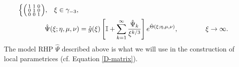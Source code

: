 \documentclass[usenames,dvipsnames]{article}
\theoremstyle{definition}
\numberwithin{equation}{section}
\numberwithin{figure}{section}
\begin{document}
\begin{align}
\begin{cases}
                   \begin{psmallmatrix}
                       1 & 1 & 0\\
                       0 & 1 & 0\\
                       0 & 0 & 1\\
                   \end{psmallmatrix}, & \xi \in \gamma_{-3},
                \end{cases}\\
            \hat{\Psi}(\xi;\eta,\mu,\nu) &= \hat{g}(\xi) \left[\mathbb{I}+ \sum_{k=1}^{\infty} \frac{\hat{\Psi}_k}{\xi^{k/3}}\right]e^{\hat{\Theta}(\xi;\eta,\mu,\nu)},\qquad\qquad \xi\to \infty .\label{Psi-hat-asymptotics}
    \end{align} 
The model RHP $\hat{\Psi}$ described above is what we will use in the construction of local parametrices (cf. Equation \eqref{D-matrix}).
\end{document}
